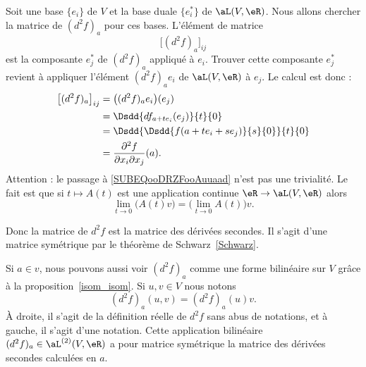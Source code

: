 Soit une base \( \{ e_i \}\) de \( V\) et la base duale \( \{ e_i^* \}\) de \( \aL(V,\eR)\). Nous allons chercher la matrice de \( (d^2f)_a\) pour ces bases. L'élément de matrice
\begin{equation}
    \big[ (d^2f)_a \big]_{ij}
\end{equation}
est la composante \( e_j^*\) de \( (d^2f)_a\) appliqué à \( e_i\). Trouver cette composante \( e_j^*\) revient à appliquer l'élément \( (d^2f)_ae_i\) de \( \aL(V,\eR)\) à \( e_j\). Le calcul est donc :
\begin{subequations}
    \begin{align}
        \big[ (d^2f)_{a} \big]_{ij}&=\big( (d^2f)_ae_i \big)(e_j)\\
        &=\Dsdd{ df_{a+te_i}(e_j) }{t}{0}       \label{SUBEQooDRZFooAuuaad}\\
        &=\Dsdd{    \Dsdd{ f(a+te_i+se_j) }{s}{0}    }{t}{0}\\
        &=\frac{ \partial^2f }{ \partial x_i\partial x_j }(a).
    \end{align}
\end{subequations}
Attention : le passage à \eqref{SUBEQooDRZFooAuuaad} n'est pas une trivialité. Le fait est que si \( t\mapsto A(t)\) est une application continue \( \eR\to \aL(V,\eR)\) alors
\begin{equation}
    \lim_{t\to 0} \big( A(t)v \big)=\big( \lim_{t\to 0} A(t) \big)v.
\end{equation}

Donc la matrice de \( d^2f  \) est la matrice des dérivées secondes. Il s'agit d'une matrice symétrique par le théorème de Schwarz~\ref{Schwarz}.

\begin{normaltext}      \label{NORMooZAOEooGqjpLH}
    Si \( a\in v\), nous pouvons aussi voir \( (d^2f)_a\) comme une forme bilinéaire sur \( V\) grâce à la proposition~\ref{isom_isom}. Si \( u,v\in V\) nous notons
    \begin{equation}
        (d^2f)_a(u,v)=(d^2f)_a(u)v.
    \end{equation}
    À droite, il s'agit de la définition réelle de \( d^2f\) sans abus de notations, et à gauche, il s'agit d'une notation. Cette application bilinéaire \( (d^2f)_a\in \aL^{(2)}(V,\eR)\) a pour matrice symétrique la matrice des dérivées secondes calculées en \( a\).
\end{normaltext}

